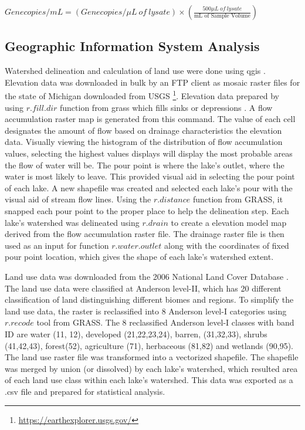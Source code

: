 \begin{center}
  $Genecopies/mL = (Genecopies/\mu L \: of \: lysate) \times (\frac{500\mu L \: of \: lysate}{\text{mL of Sample Volume}})$
\end{center}

\subsection{Geographic Information System Analysis}

Watershed delineation and calculation of land use were done using \gls{qgis} \cite{qgis_development_team_qgis_2009}.
Elevation data was downloaded in bulk by an FTP client as mosaic raster files for the state of Michigan downloaded from USGS \footnote{\url{https://earthexplorer.usgs.gov/}}.
Elevation data  prepared by using $r.fill.dir$ function from \gls{grass} which fills sinks or depressions \cite{grass_development_team_geographic_2017}. A flow accumulation raster map is generated from this command. The value of each cell designates the amount of flow based on drainage characteristics the elevation data. Visually viewing the histogram of the distribution of flow accumulation values, selecting the highest values displays will display the most probable areas the flow of water will be. The pour point is where the lake's outlet, where the water is most likely to leave. This provided visual aid in selecting the pour point of each lake. A new shapefile was created and selected each lake's pour with the visual aid of stream flow lines. Using the $r.distance$ function from GRASS, it snapped each pour point to the proper place to help the delineation step. Each lake's watershed was delineated using $r.drain$ to create a elevation model map derived from the flow accumulation raster file. The drainage raster file is then used as an input for function $r.water.outlet$ along with the coordinates of fixed pour point location, which gives the shape of each lake's watershed extent.

Land use data was downloaded from the 2006 National Land Cover Database \cite{homer_development_2004}. The land use data were classified at Anderson level-II, which has 20 different classification of land distinguishing different biomes and regions.  To simplify the land use data, the raster is reclassified into 8 Anderson level-I categories using $r.recode$ tool from GRASS. The 8 reclassified Anderson level-I classes with band ID are water (11, 12), developed (21,22,23,24), barren, (31,32,33), shrubs (41,42,43), forest(52), agriculture (71), herbaceous (81,82) and wetlands (90,95). The land use raster file was transformed into a vectorized shapefile. The shapefile was merged by union (or dissolved) by each lake's watershed, which resulted area of each land use class within each lake's watershed. This data was exported as a .csv file and prepared for statistical analysis.


